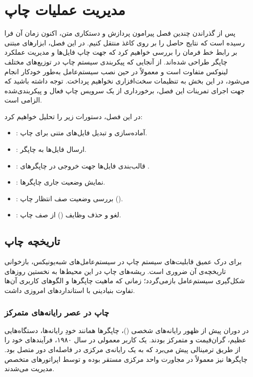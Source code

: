 \chapter{مدیریت عملیات چاپ}

پس از گذراندن چندین فصل پیرامون پردازش و دستکاری متن، اکنون زمان آن فرا رسیده است که نتایج حاصل را بر روی کاغذ منتقل کنیم. در این فصل، ابزارهای مبتنی بر رابط خط فرمان را بررسی خواهیم کرد که جهت چاپ فایل‌ها و مدیریت عملکرد چاپگر طراحی شده‌اند. از آنجایی که پیکربندی سیستم چاپ در توزیع‌های مختلف لینوکس متفاوت است و معمولاً در حین نصب سیستم‌عامل به‌طور خودکار انجام می‌شود، در این بخش به تنظیمات سخت‌افزاری نخواهیم پرداخت. توجه داشته باشید که جهت اجرای تمرینات این فصل، برخورداری از یک سرویس چاپ فعال و پیکربندی‌شده الزامی است.

در این فصل، دستورات زیر را تحلیل خواهیم کرد:

\begin{itemize}
  \item {}: آماده‌سازی و تبدیل فایل‌های متنی برای چاپ.
  \item {}: ارسال فایل‌ها به چاپگر.
  \item {}: قالب‌بندی فایل‌ها جهت خروجی در چاپگرهای .
  \item {}: نمایش وضعیت جاری چاپگرها.
  \item {}: بررسی وضعیت صف انتظار چاپ ().
  \item {}: لغو و حذف وظایف () از صف چاپ.
\end{itemize}

\section{تاریخچه چاپ}

برای درک عمیق قابلیت‌های سیستم چاپ در سیستم‌عامل‌های شبه‌یونیکس، بازخوانی تاریخچه‌ی آن ضروری است. ریشه‌های چاپ در این محیط‌ها به نخستین روزهای شکل‌گیری سیستم‌عامل بازمی‌گردد؛ زمانی که ماهیت چاپگرها و الگوهای کاربری آن‌ها تفاوت بنیادینی با استانداردهای امروزی داشت.

\subsection{چاپ در عصر رایانه‌های متمرکز}

در دوران پیش از ظهور رایانه‌های شخصی ()، چاپگرها همانند خودِ رایانه‌ها، دستگاه‌هایی عظیم، گران‌قیمت و متمرکز بودند. یک کاربر معمولی در سال ۱۹۸۰، فرآیندهای خود را از طریق ترمینالی پیش می‌برد که به یک رایانه‌ی مرکزی در فاصله‌ای دور متصل بود. چاپگرها نیز معمولاً در مجاورت واحد مرکزی مستقر بوده و توسط اپراتورهای متخصص مدیریت می‌شدند.

